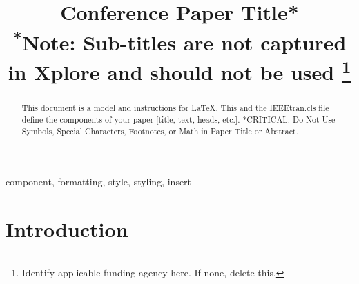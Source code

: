 \documentclass[conference,compsoc]{IEEEtran}
\begin{document}
\title{Conference Paper Title*\\
{\footnotesize \textsuperscript{*}Note: Sub-titles are not captured in Xplore and
should not be used}
\thanks{Identify applicable funding agency here. If none, delete this.}
}

\author{
\and
{}
\and
{}
}

\maketitle

\begin{abstract}
This document is a model and instructions for \LaTeX.
This and the IEEEtran.cls file define the components of your paper [title, text, heads, etc.]. *CRITICAL: Do Not Use Symbols, Special Characters, Footnotes, 
or Math in Paper Title or Abstract.
\end{abstract}

\begin{IEEEkeywords}
component, formatting, style, styling, insert
\end{IEEEkeywords}

\section{Introduction}
\end{document}
